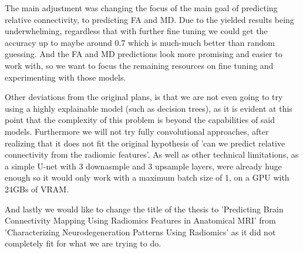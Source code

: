 
The main adjustment was changing the focus of the main goal of predicting relative connectivity, to predicting \ac{FA} and \ac{MD}. Due to the yielded results being underwhelming, regardless that with further fine tuning we could get the accuracy up to maybe around 0.7 which is much-much better than random guessing. And the \ac{FA} and \ac{MD} predictions look more promising and easier to work with, so we want to focus the remaining resources on fine tuning and experimenting with those models.\par

Other deviations from the original plans, is that we are not even going to try using a highly explainable model (such as decision trees), as it is evident at this point that the complexity of this problem is beyond the capabilities of said models. Furthermore we will not try fully convolutional approaches, after realizing that it does not fit the original hypothesis of 'can we predict relative connectivity from the radiomic features'. As well as other technical limitations, as a simple U-net with 3 downasmple and 3 upsample layers, were already huge enough so it would only work with a maximum batch size of 1, on a GPU with 24GBs of VRAM.\par

And lastly we would like to change the title of the thesis to 'Predicting Brain Connectivity Mapping Using Radiomics Features in Anatomical MRI' from 'Characterizing Neurodegeneration Patterns Using Radiomics' as it did not completely fit for what we are trying to do.